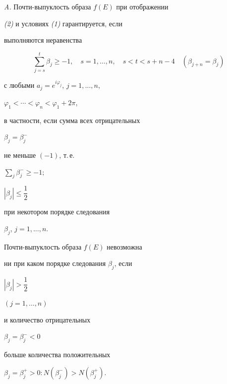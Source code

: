 \begin{thm} {\em A.} Почти-выпуклость образа $f(E)$ при отображении


{\em (2)} и условиях {\em (1)} гарантируется, если





 выполняются неравенства


\begin{equation}


\sum_{j=s}^{t}\beta _{j} \ge -1,\quad


s=1,\dotsc,n,\quad


s<t<s+n-4 \quad


(\beta _{j+n}=\beta _{j})


\end{equation}




с любыми $a_{j}=e^{i\varphi _{j}}$, $j=1,\dotsc,n$,


$\varphi _{1}<\dotsb <\varphi _{n}<\varphi _{1}+2\pi$,


в частности, если сумма всех отрицательных


$\beta _{j}=\beta _{j}^{-}$


не меньше $(-1)$, т.\,е.


$\sum\limits_{j}\beta _{j}^{-} \ge -1;$







$|\beta _{j}| \le \dfrac{1}{2}$


при некотором порядке следования


$\beta_{j}$, $j=1,\dotsc,n$.





 Почти-выпуклость образа $f(E)$ невозможна


ни при каком порядке следования $\beta _{j}$, если


$|\beta_{j}| > \dfrac{1}{2}$


$(j=1,\dotsc,n)$


и количество отрицательных


$\beta _{j}=\beta _{j}^{-}<0$


больше количества положительных


$\beta_j=\beta_j^+>0:N(\beta_j^-) > N(\beta_j^+)$.


\end{thm}





